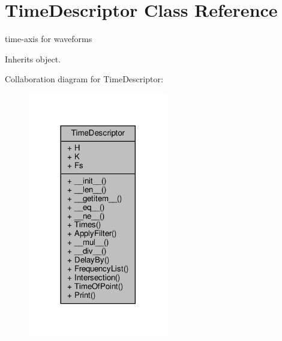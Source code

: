 \hypertarget{classSignalIntegrity_1_1TimeDomain_1_1Waveform_1_1TimeDescriptor_1_1TimeDescriptor}{}\section{Time\+Descriptor Class Reference}
\label{classSignalIntegrity_1_1TimeDomain_1_1Waveform_1_1TimeDescriptor_1_1TimeDescriptor}


time-\/axis for waveforms  




Inherits object.



Collaboration diagram for Time\+Descriptor\+:
\nopagebreak
\begin{figure}[H]
\begin{center}
\leavevmode
\includegraphics[width=173pt]{classSignalIntegrity_1_1TimeDomain_1_1Waveform_1_1TimeDescriptor_1_1TimeDescriptor__coll__graph}
\end{center}
\end{figure}
